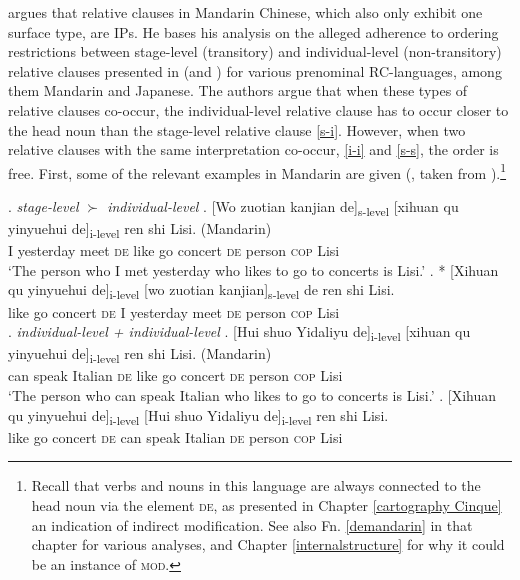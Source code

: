 \documentclass [output=book,colorlinks,citecolor=brown]{langscibook}
\begin{document}
\citet[ch. 3.6]{cinque:2020:relcl} argues that relative clauses in Mandarin Chinese, which also only exhibit one surface type, are IPs. He bases his analysis on the alleged adherence to ordering restrictions between stage-level (transitory) and individual-level (non-transitory) relative clauses presented in \citet{larson:2004:order} (and \citealt{gobbo:2005:chinese}) for various prenominal RC-languages, among them Mandarin and Japanese. The authors argue that when these types of relative clauses co-occur, the individual-level relative clause has to occur closer to the head noun than the stage-level relative clause \ref{s-i}. However, when two relative clauses with the same interpretation co-occur, \ref{i-i} and \ref{s-s}, the order is free. First, some of the relevant examples in Mandarin are given (\citealt[104]{larson:2004:order}, taken from \citealt[298]{gobbo:2005:chinese}).\footnote{Recall that verbs and nouns in this language are always connected to the head noun via the element \textsc{de}, as presented in Chapter \ref{cartography Cinque} an indication of indirect modification. See also Fn. \ref{demandarin} in that chapter for various analyses, and Chapter \ref{internalstructure} for why it could be an instance of \textsc{mod}.} %

\ex. \label{ex1} \emph{stage-level $\succ$ individual-level} \label{s-i}
\ag. [Wo zuotian kanjian de]\textsubscript{s-level} [xihuan qu yinyuehui de]\textsubscript{i-level} ren shi Lisi. (Mandarin)\\
I yesterday meet \textsc{de} like go concert \textsc{de} person \textsc{cop} Lisi\\
`The person who I met yesterday who likes to go to concerts is Lisi.'
\bg. * [Xihuan qu yinyuehui de]\textsubscript{i-level} [wo zuotian kanjian]\textsubscript{s-level} de ren shi Lisi.\\
like go concert \textsc{de} I yesterday meet \textsc{de} person \textsc{cop} Lisi\\

\ex. \label{ex2} \emph{individual-level + individual-level} \label{i-i}
\ag. [Hui shuo Yidaliyu de]\textsubscript{i-level} [xihuan qu yinyuehui de]\textsubscript{i-level} ren shi Lisi. (Mandarin)\\
can speak Italian \textsc{de} like go concert \textsc{de} person \textsc{cop} Lisi\\
`The person who can speak Italian who likes to go to concerts is Lisi.'
\bg. [Xihuan qu yinyuehui de]\textsubscript{i-level} [Hui shuo Yidaliyu de]\textsubscript{i-level} ren shi Lisi.\\
like go concert \textsc{de} can speak Italian \textsc{de} person \textsc{cop} Lisi\\
\end{document}

